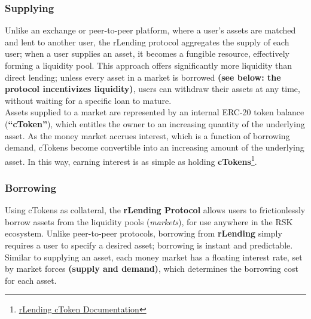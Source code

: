 \documentclass{article}
\begin{document}
\subsubsection{Supplying}
Unlike an exchange or peer-to-peer platform, where a user's assets are matched and lent to another
user, the rLending protocol aggregates the supply of each user; when a user supplies an asset, it
becomes a fungible resource, effectively forming a liquidity pool. This approach offers significantly more liquidity than direct lending; unless every asset in a market is borrowed \textbf{(see below: the protocol incentivizes liquidity)}, users can withdraw their assets at any time, without waiting for a specific loan to mature.
\\
Assets supplied to a market are represented by an internal ERC-20 token balance (\textbf{“cToken”}), which entitles the owner to an increasing quantity of the underlying asset. As the money market accrues interest, which is a function of borrowing demand, cTokens become convertible into an increasing amount of the underlying asset. In this way, earning interest is as simple as holding \textbf{cTokens}\footnote{\href{https://test.rlending.app/doc/keyConcepts\#ctokens}{rLending cToken Documentation}}.

\subsubsection{Borrowing}

Using cTokens as collateral, the \textbf{rLending Protocol} allows users to frictionlessly borrow assets from the liquidity pools (\textit{markets}), for use anywhere in the RSK ecosystem. Unlike peer-to-peer protocols, borrowing from \textbf{rLending} simply requires a user to specify a desired asset; borrowing is instant and predictable. Similar to supplying an asset, each money market has a floating interest rate, set by market forces \textbf{(supply and demand)}, which determines the borrowing cost for each asset.

\end{document}
